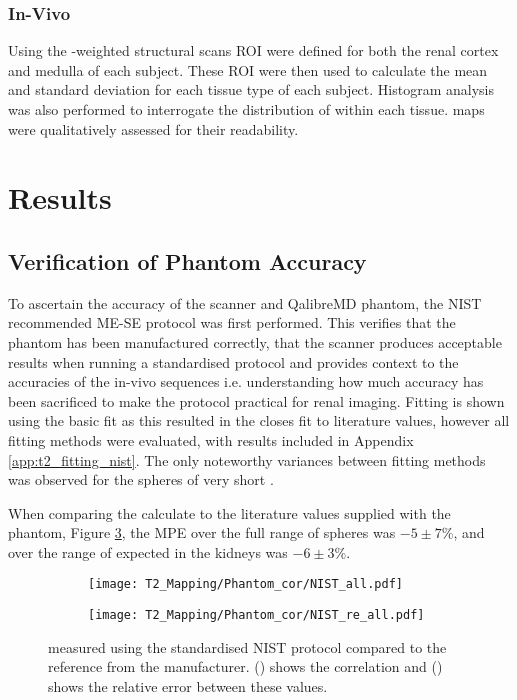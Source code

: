 \subsubsection{In-Vivo}

Using the \tone-weighted structural scans \ac{ROI} were defined for both the renal cortex and medulla of each subject. These \ac{ROI} were then used to calculate the mean and standard deviation \ttwo for each tissue type of each subject. Histogram analysis was also performed to interrogate the distribution of \ttwo within each tissue. \ttwo maps were qualitatively assessed for their readability.

\newpage

\section{Results}

\subsection{Verification of Phantom Accuracy}
To ascertain the accuracy of the scanner and QalibreMD phantom, the \ac{NIST} recommended ME-SE protocol was first performed. This verifies that the phantom has been manufactured correctly, that the scanner produces acceptable results when running a standardised protocol and provides context to the accuracies of the in-vivo sequences i.e. understanding how much accuracy has been sacrificed to make the protocol practical for renal imaging. Fitting is shown using the basic fit as this resulted in the closes fit to literature values, however all fitting methods were evaluated, with results included in Appendix \ref{app:t2_fitting_nist}. The only noteworthy variances between fitting methods was observed for the spheres of very short \ttwo.

When comparing the \ttwo calculate to the literature values supplied with the phantom, Figure \ref{fig:t2_nist}, the \ac{MPE} over the full range of spheres was $-5 \pm 7\%$, and over the range of \ttwo expected in the kidneys was $-6 \pm 3\%$. 

\begin{figure}[H]
	\centering
	\begin{subfigure}[c]{0.47\textwidth}
		\centering
		\texttt{[image: T2\_Mapping/Phantom\_cor/NIST\_all.pdf]}
		\caption{}
		\label{fig:t2_nist_cor}
	\end{subfigure}
	\hfill
	\begin{subfigure}[c]{0.47\textwidth}
		\centering
		\texttt{[image: T2\_Mapping/Phantom\_cor/NIST\_re\_all.pdf]}
		\caption{}
		\label{fig:t2_nist_re}
	\end{subfigure}
	\caption{\ttwo measured using the standardised \ac{NIST} protocol compared to the reference \ttwo from the manufacturer. () shows the correlation and () shows the relative error between these values.}
	\label{fig:t2_nist}
\end{figure}
